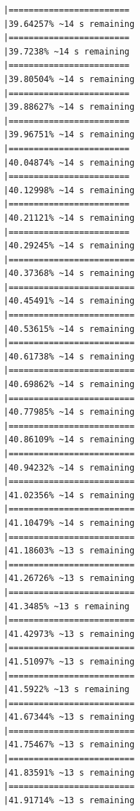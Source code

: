 \documentclass{article}\usepackage[]{graphicx}\usepackage[]{xcolor}
\makeatletter
\newenvironment{kframe}{%
 \def\at@end@of@kframe{}%
 \ifinner\ifhmode%
  \def\at@end@of@kframe{\end{minipage}}%
  \begin{minipage}{\columnwidth}%
 \fi\fi%
 \def\FrameCommand##1{\hskip\@totalleftmargin \hskip-\fboxsep
 \colorbox{shadecolor}{##1}\hskip-\fboxsep
     \hskip-\linewidth \hskip-\@totalleftmargin \hskip\columnwidth}%
 \MakeFramed {\advance\hsize-\width
   \@totalleftmargin\z@ \linewidth\hsize
   \@setminipage}}%
 {\par\unskip\endMakeFramed%
 \at@end@of@kframe}
\newenvironment{knitrout}{}{} %
\makeatother
\begin{document}
\begin{knitrout}
\begin{kframe}
\begin{verbatim}
|========================                                      |39.64257% ~14 s remaining 
|========================                                      |39.7238% ~14 s remaining  
|========================                                      |39.80504% ~14 s remaining 
|========================                                      |39.88627% ~14 s remaining 
|========================                                      |39.96751% ~14 s remaining 
|========================                                      |40.04874% ~14 s remaining 
|========================                                      |40.12998% ~14 s remaining 
|========================                                      |40.21121% ~14 s remaining 
|========================                                      |40.29245% ~14 s remaining 
|=========================                                     |40.37368% ~14 s remaining 
|=========================                                     |40.45491% ~14 s remaining 
|=========================                                     |40.53615% ~14 s remaining 
|=========================                                     |40.61738% ~14 s remaining 
|=========================                                     |40.69862% ~14 s remaining 
|=========================                                     |40.77985% ~14 s remaining 
|=========================                                     |40.86109% ~14 s remaining 
|=========================                                     |40.94232% ~14 s remaining 
|=========================                                     |41.02356% ~14 s remaining 
|=========================                                     |41.10479% ~14 s remaining 
|=========================                                     |41.18603% ~13 s remaining 
|=========================                                     |41.26726% ~13 s remaining 
|=========================                                     |41.3485% ~13 s remaining  
|=========================                                     |41.42973% ~13 s remaining 
|=========================                                     |41.51097% ~13 s remaining 
|=========================                                     |41.5922% ~13 s remaining  
|=========================                                     |41.67344% ~13 s remaining 
|=========================                                     |41.75467% ~13 s remaining 
|=========================                                     |41.83591% ~13 s remaining 
|=========================                                     |41.91714% ~13 s remaining 

\end{verbatim}
\end{kframe}
\end{knitrout}
\end{document}
